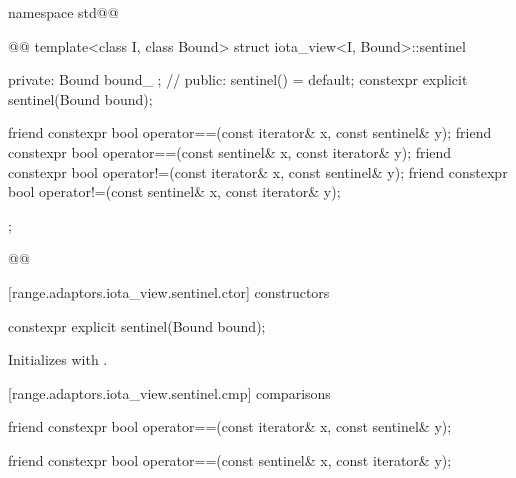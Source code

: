 {\begin{codeblock}
namespace std@@ { @@
  template<class I, class Bound>
  struct iota_view<I, Bound>::sentinel {
  private:
    Bound bound_ {}; // \expos
  public:
    sentinel() = default;
    constexpr explicit sentinel(Bound bound);

    friend constexpr bool operator==(const iterator& x, const sentinel& y);
    friend constexpr bool operator==(const sentinel& x, const iterator& y);
    friend constexpr bool operator!=(const iterator& x, const sentinel& y);
    friend constexpr bool operator!=(const sentinel& x, const iterator& y);
  };
}@\oldtxt{\}}@
\end{codeblock}

[range.adaptors.iota_view.sentinel.ctor]{ constructors}

\begin{itemdecl}
constexpr explicit sentinel(Bound bound);
\end{itemdecl}

\begin{itemdescr}
\pnum
\effects Initializes  with .
\end{itemdescr}

[range.adaptors.iota_view.sentinel.cmp]{ comparisons}

\begin{itemdecl}
friend constexpr bool operator==(const iterator& x, const sentinel& y);
\end{itemdecl}

\begin{itemdescr}
\pnum
\oldtxt{\returns} 
\end{itemdescr}

\begin{itemdecl}
friend constexpr bool operator==(const sentinel& x, const iterator& y);
\end{itemdecl}

\begin{itemdescr}
\pnum
\oldtxt{\returns} 
\end{itemdescr}

}
